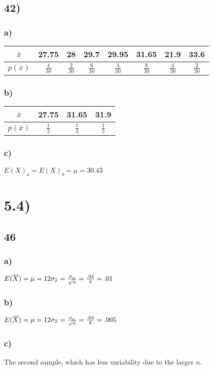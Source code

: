 \documentclass{article}
\begin{document}
	\subsection*{42)}
		\subsubsection*{a)}
			\begin{tabular}{c || c | c | c | c | c | c | c}
				$\overline{x}$ & 27.75 & 28 & 29.7 & 29.95 & 31.65 & 21.9 & 33.6 \\ \hline
				$p(\overline{x})$ & $\frac{4}{30}$ & $\frac{2}{30}$ & $\frac{6}{30}$ & $\frac{4}{30}$ & $\frac{8}{30}$ & $\frac{4}{30}$ & $\frac{2}{30}$
			\end{tabular}
		\subsubsection*{b)}
			\begin{tabular}{c || c | c | c}
				$\overline{x}$ & 27.75 & 31.65 & 31.9 \\ \hline
				$p(\overline{x})$ & $\frac{1}{3}$ & $\frac{1}{3}$ & $\frac{1}{3}$
			\end{tabular}
		\subsubsection*{c)}		
			$E(X)_a = E(X)_b = \mu = 30.4\overline{3}$						
\section*{5.4)}
	\subsection*{46}
		\subsubsection*{a)}			 			$E(\overline{X}) = \mu = 12 \\ \sigma_{\overline{x}} = \frac{\sigma_x}{\sqrt{n}} = \frac{.04}{4} = .01$
		
		\subsubsection*{b)}
			$ E(\overline{X}) = \mu =12\\
			\sigma_{\overline{x}} = \frac{\sigma_x}{\sqrt{n}} = \frac{.04}{8} = .005 $
		\subsubsection*{c)}
			The second sample, which has less variability due to the larger $n$.
\end{document}
